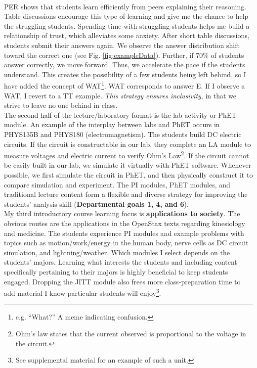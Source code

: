 \documentclass[../../../main.tex]{subfiles}
\begin{document}
\\
\vspace{0.25cm}
PER shows that students learn efficiently from peers explaining their reasoning.  Table discussions encourage this type of learning and give me the chance to help the struggling students.  Spending time with struggling students helps me build a relationship of trust, which alleviates some anxiety.  After short table discussions, students submit their answers again.  We observe the answer distribution shift toward the correct one (see Fig. \ref{fig:exampleData}).  Further, if 70\% of students answer correctly, we move forward.  Thus, we accelerate the pace if the students understand.  This creates the possibility of a few students being left behind, so I have added the concept of WAT\footnote{e.g. ``What?'' A meme indicating confusion.}.  WAT corresponds to answer E.  If I observe a WAT, I revert to a TT example.  \textit{This strategy ensures inclusivity}, in that we strive to leave no one behind in class.
\\
\vspace{0.25cm}
The second-half of the lecture/laboratory format is the lab activity or PhET module.  An example of the interplay between labs and PhET occurs in PHYS135B and PHYS180 (electromagnetism).  The students build DC electric circuits.  If the circuit is constructable in our lab, they complete an LA module to measure voltages and electric current to verify Ohm's Law\footnote{Ohm's law states that the current observed is proportional to the voltage in the circuit.}.  If the circuit cannot be easily built in our lab, we simulate it virtually with PhET software.  Whenever possible, we first simulate the circuit in PhET, and then physically construct it to compare simulation and experiment.  The PI modules, PhET modules, and traditional lecture content form a flexible and diverse strategy for improving the students' analysis skill (\textbf{Departmental goals 1, 4, and 6}).
\\
\vspace{0.25cm}
My third introductory course learning focus is \textbf{applications to society}.  The obvious routes are the applications in the OpenStax texts \cite{openstax1} regarding kinesiology and medicine.  The students experience PI modules and example problems with topics such as motion/work/energy in the human body, nerve cells as DC circuit simulation, and lightning/weather.  Which modules I select depends on the students' majors.  Learning what interests the students and including content specifically pertaining to their majors is highly beneficial to keep students engaged.  Dropping the JITT module also frees more class-preparation time to add material I know particular students will enjoy\footnote{See supplemental material for an example of such a unit.}.
\end{document}
